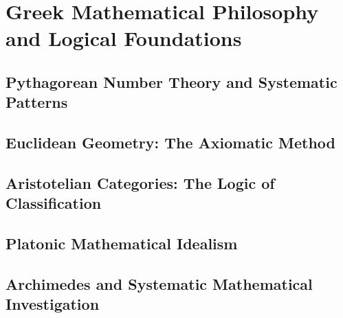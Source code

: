 

\chapter{Greek Mathematical Philosophy and Logical Foundations}

\section{Pythagorean Number Theory and Systematic Patterns}

\section{Euclidean Geometry: The Axiomatic Method}

\section{Aristotelian Categories: The Logic of Classification}

\section{Platonic Mathematical Idealism}

\section{Archimedes and Systematic Mathematical Investigation}
